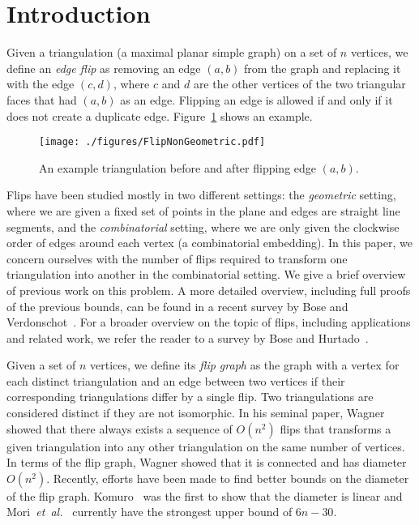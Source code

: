 \pdfoutput=1 \documentclass[12pt]{elsarticle}
\newcommand{\etal}{\emph{et~al.}\xspace}
\begin{document}
\section{Introduction}
\label{sec:introduction}

\noindent Given a triangulation (a maximal planar simple graph) on a set of $n$ vertices, we define an \emph{edge flip} as removing an edge $(a,b)$ from the graph and replacing it with the edge $(c, d)$, where $c$ and $d$ are the other vertices of the two triangular faces that had $(a, b)$ as an edge. Flipping an edge is allowed if and only if it does not create a duplicate edge. Figure~\ref{fig:flip} shows an example.

\begin{figure}[b]
 \centering
 \texttt{[image: ./figures/FlipNonGeometric.pdf]}
 \caption{An example triangulation before and after flipping edge $(a, b)$.}
 \label{fig:flip}
\end{figure}

Flips have been studied mostly in two different settings: the \emph{geometric} setting, where we are given a fixed set of points in the plane and edges are straight line segments, and the \emph{combinatorial} setting, where we are only given the clockwise order of edges around each vertex (a combinatorial embedding). In this paper, we concern ourselves with the number of flips required to transform one triangulation into another in the combinatorial setting. We give a brief overview of previous work on this problem. A more detailed overview, including full proofs of the previous bounds, can be found in a recent survey by Bose and Verdonschot~\cite{bose2012history}. For a broader overview on the topic of flips, including applications and related work, we refer the reader to a survey by Bose and Hurtado~\cite{bose2009flips}.

Given a set of $n$ vertices, we define its \emph{flip graph} as the graph with a vertex for each distinct triangulation and an edge between two vertices if their corresponding triangulations differ by a single flip. Two triangulations are considered distinct if they are not isomorphic. In his seminal paper, Wagner~\cite{wagner1936bemerkungenzum} showed that there always exists a sequence of $O(n^2)$ flips that transforms a given triangulation into any other triangulation on the same number of vertices. In terms of the flip graph, Wagner showed that it is connected and has diameter $O(n^2)$. Recently, efforts have been made to find better bounds on the diameter of the flip graph. Komuro~\cite{komuro1997diagonal} was the first to show that the diameter is linear and Mori~\etal~\cite{mori2003diagonal} currently have the strongest upper bound of $6n - 30$.
\end{document}
